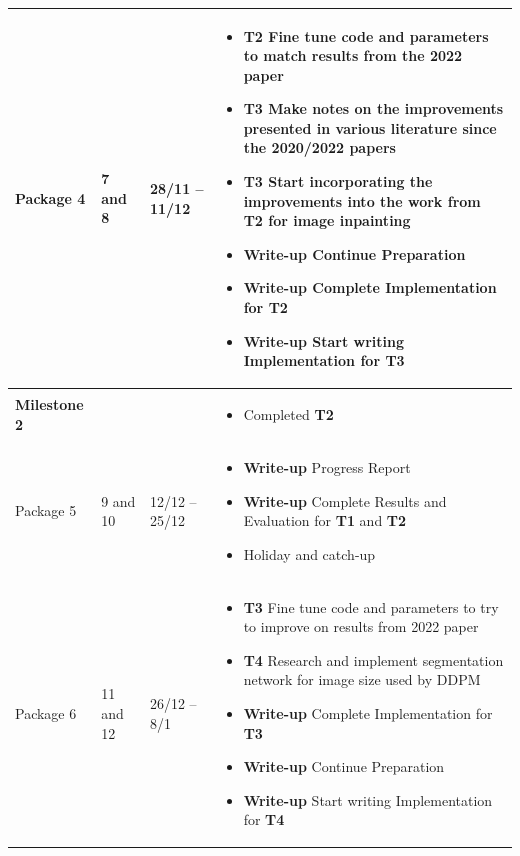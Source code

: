 \documentclass{article}
\begin{document}
\begin{longtable}{p{2.5cm}p{1.5cm}P{2.5cm}P{6.8cm}}
    Package 4 &
    7 and 8  &
    28/11 -- 11/12 &
    \begin{itemize}[label={--},noitemsep,leftmargin=*,topsep=0pt,partopsep=0pt]
        \item \textbf{T2} Fine tune code and parameters to match results from the 2022 paper
        \item \textbf{T3} Make notes on the improvements presented in various literature since the 2020/2022 papers
        \item \textbf{T3} Start incorporating the improvements into the work from \textbf{T2} for image inpainting
        \item \textbf{Write-up} Continue Preparation
        \item \textbf{Write-up} Complete Implementation for \textbf{T2}
        \item \textbf{Write-up} Start writing Implementation for \textbf{T3} 
    \end{itemize}\\
    \hline
    
    \textbf{Milestone 2} &
    &
    &
    \begin{itemize}[label={--},noitemsep,leftmargin=*,topsep=0pt,partopsep=0pt]
        \item Completed \textbf{T2}
    \end{itemize}\\
    \hline
    
    Package 5 &
    9 and 10  &
    12/12 -- 25/12 &
    \begin{itemize}[label={--},noitemsep,leftmargin=*,topsep=0pt,partopsep=0pt]
        \item \textbf{Write-up} Progress Report
        \item \textbf{Write-up} Complete Results and Evaluation for \textbf{T1} and \textbf{T2}
        \item Holiday and catch-up
    \end{itemize}\\
    \hline
    
    Package 6 &
    11 and 12  &
    26/12 -- 8/1 &
    \begin{itemize}[label={--},noitemsep,leftmargin=*,topsep=0pt,partopsep=0pt]
        \item \textbf{T3} Fine tune code and parameters to try to improve on results from 2022 paper
        \item \textbf{T4} Research and implement segmentation network for image size used by DDPM
        \item \textbf{Write-up} Complete Implementation for \textbf{T3}
        \item \textbf{Write-up} Continue Preparation
        \item \textbf{Write-up} Start writing Implementation for \textbf{T4} 
    \end{itemize}\\
    \hline
    

\end{longtable}
\end{document}
